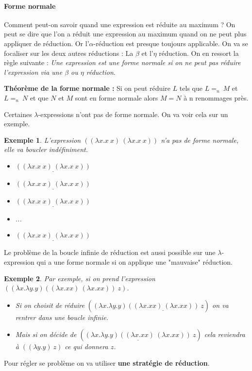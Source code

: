 \documentclass[10pt,a4paper]{report}
\newtheorem{ex}{Exemple}
\begin{document}
	\paragraph{Forme normale} Comment peut-on savoir quand une expression est réduite au maximum ? On peut se dire que l'on a réduit une expression au maximum quand on ne peut plus appliquer de réduction. Or l'$\alpha$-réduction est presque toujours applicable. On va se focaliser sur les deux autres réductions : La $\beta$ et l'$\eta$ réduction. On en ressort la règle suivante : \textit{Une expression est une forme normale si on ne peut pas réduire l'expression via une $\beta$ ou $\eta$ réduction}.
	\medbreak
	
	\textbf{Théorème de la forme normale :}
	Si on peut réduire $L$ tels que $L =_{n}~M$ et $L =_{n}~N$ et que $N$ et $M$ sont en forme normale alors $M = N$ à n renommages près.
	\medbreak
	
	Certaines $\lambda$-expressions n'ont pas de forme normale. On va voir cela sur un exemple.
	\begin{ex}
		 L'expression $((\lambda x.x~x)~(\lambda x.x~x))$ n'a pas de forme normale, elle va boucler indéfiniment.
		\begin{itemize}
			\item[~~~~] $\underline{((\lambda x.x~x)~(\lambda x.x~x))}$
			\item[$\rightarrow_{\beta}$] $\underline{((\lambda x.x~x)~(\lambda x.x~x))}$
			\item[$\rightarrow_{\beta}$] $\underline{((\lambda x.x~x)~(\lambda x.x~x))}$
			\item ...
			\item[$\rightarrow_{\beta}$] $\underline{((\lambda x.x~x)~(\lambda x.x~x))}$
		\end{itemize}
	\end{ex}
	\medbreak
	
	Le problème de la boucle infinie de réduction est aussi possible sur une $\lambda
	$-expression qui a une forme normale si on applique une "mauvaise" réduction.
	\begin{ex}
		Par exemple, si on prend l'expression $((\lambda x.\lambda y. y) ((\lambda x.x x)~(\lambda x.x x))~z)$.
		\begin{itemize}
			\item[] Si on choisit de réduire $((\lambda x.\lambda y. y) \underline{((\lambda x.x x)~(\lambda x.x x))}~z)$ on va rentrer dans une boucle infinie. 
			\item[] Mais si on décide de $(\underline{(\lambda x.\lambda y. y) ((\lambda x.x x)~(\lambda x.x x))}~z)$ cela reviendra à $((\lambda y.y)~z)$ ce qui donnera $z$.
		\end{itemize}
		
	\end{ex}
	\medbreak
	Pour régler se problème on va utiliser \textbf{une stratégie de réduction}.
	
\end{document}
